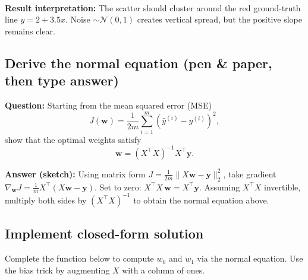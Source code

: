 \documentclass[11pt]{article}
\begin{document}
    \begin{center}
    \end{center}
    { \hspace*{\fill} \\}
    
    \textbf{Result interpretation:} The scatter should cluster around the
red ground-truth line \(y = 2 + 3.5x\). Noise \(\sim \mathcal{N}(0,1)\)
creates vertical spread, but the positive slope remains clear.

    \subsection{Derive the normal equation (pen \& paper, then type
answer)}\label{derive-the-normal-equation-pen-paper-then-type-answer}

\textbf{Question:} Starting from the mean squared error (MSE) \[
J(\mathbf{w}) = \frac{1}{2m}\sum_{i=1}^m (\hat y^{(i)} - y^{(i)})^2,
\] show that the optimal weights satisfy \[
\mathbf{w} = (X^\top X)^{-1}X^\top \mathbf{y}.
\]

\textbf{Answer (sketch):} Using matrix form
\(J = \tfrac{1}{2m}\|X\mathbf{w}-\mathbf{y}\|_2^2\), take gradient
\(\nabla_{\mathbf{w}}J=\tfrac{1}{m}X^\top(X\mathbf{w}-\mathbf{y})\). Set
to zero: \(X^\top X\,\mathbf{w}=X^\top\mathbf{y}\). Assuming
\(X^\top X\) invertible, multiply both sides by \((X^\top X)^{-1}\) to
obtain the normal equation above.

    \subsection{Implement closed-form
solution}\label{implement-closed-form-solution}

Complete the function below to compute \(w_0\) and \(w_1\) via the
normal equation. Use the bias trick by augmenting \(X\) with a column of
ones.
\end{document}
